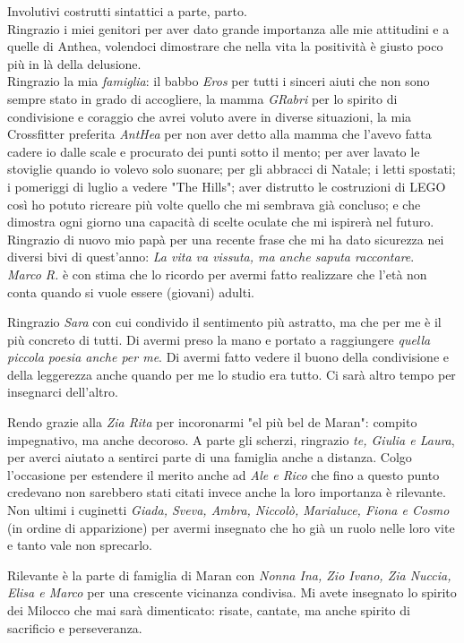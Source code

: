 \documentclass[a4paper,10pt, oneside]{book} %
\theoremstyle{definition}
\begin{document}
Involutivi costrutti sintattici a parte, parto.\\
Ringrazio i miei genitori per aver dato grande importanza alle mie attitudini e a quelle di Anthea, volendoci dimostrare che nella vita la positività è giusto poco più in là della delusione.
\\Ringrazio la mia \textit{famiglia}: il babbo \textit{Eros} per tutti i sinceri aiuti che non sono sempre stato in grado di accogliere, la mamma \textit{GRabri} per lo spirito di condivisione e coraggio che avrei voluto avere in diverse situazioni, la mia Crossfitter preferita \textit{AntHea} per non aver detto alla mamma che l'avevo fatta cadere io dalle scale e procurato dei punti sotto il mento; per aver lavato le stoviglie quando io volevo solo suonare; per gli abbracci di Natale; i letti spostati; i pomeriggi di luglio a vedere "The Hills"; aver distrutto le costruzioni di LEGO così ho potuto ricreare più volte quello che mi sembrava già concluso; e che dimostra ogni giorno una capacità di scelte oculate che mi ispirerà nel futuro. Ringrazio di nuovo mio papà per una recente frase che mi ha dato sicurezza nei diversi bivi di quest'anno: \textit{La vita va vissuta, ma anche saputa raccontare}.\\
\textit{Marco R.} è con stima che lo ricordo per avermi fatto realizzare che l'età non conta quando si vuole essere (giovani) adulti.

Ringrazio \textit{Sara} con cui condivido il sentimento più astratto, ma che per me è il più concreto di tutti. Di avermi preso la mano e portato a raggiungere \textit{quella piccola poesia anche per me}.
Di avermi fatto vedere il buono della condivisione e della leggerezza anche quando per me lo studio era tutto. Ci sarà altro tempo per insegnarci dell'altro.

Rendo grazie alla \textit{Zia Rita} per incoronarmi "el più bel de Maran": compito impegnativo, ma anche decoroso. A parte gli scherzi, ringrazio \textit{te, Giulia e Laura}, per averci aiutato a sentirci parte di una famiglia anche a distanza. Colgo l'occasione per estendere il merito anche ad \textit{Ale e Rico} che fino a questo punto credevano non sarebbero stati citati invece anche la loro importanza è rilevante. Non ultimi i cuginetti \textit{Giada, Sveva, Ambra, Niccolò, Marialuce, Fiona e Cosmo} (in ordine di apparizione) per avermi insegnato che ho già un ruolo nelle loro vite e tanto vale non sprecarlo.

Rilevante è la parte di famiglia di Maran con \textit{Nonna Ina, Zio Ivano, Zia Nuccia, Elisa e Marco} per una crescente vicinanza condivisa. Mi avete insegnato lo spirito dei Milocco che mai sarà dimenticato: risate, cantate, ma anche spirito di sacrificio e perseveranza.
\end{document}
